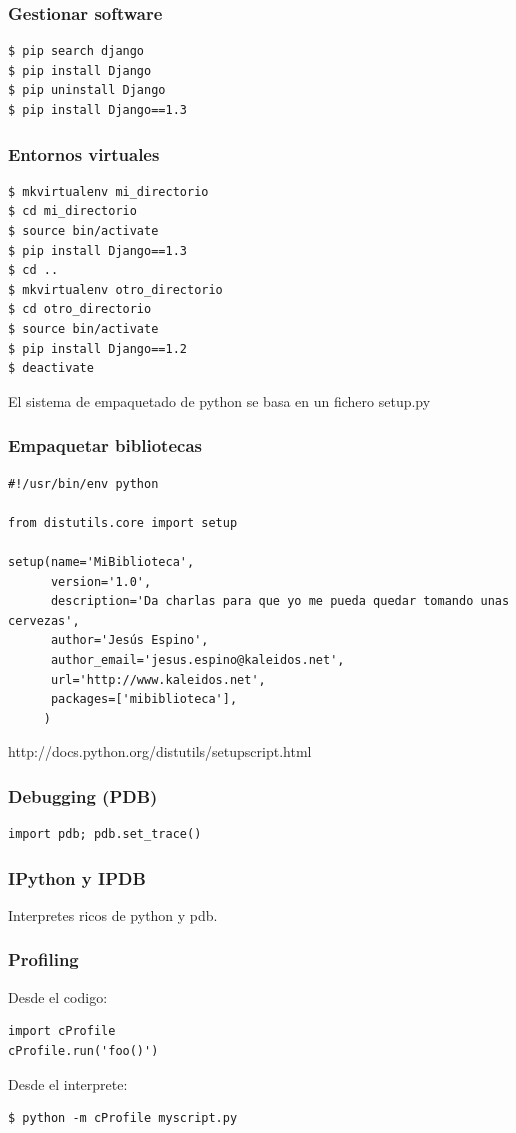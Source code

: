 \documentclass[10pt]{beamer}
\begin{document}
  \begin{frame}[containsverbatim]
    \frametitle{Gestionar software}
    \begin{verbatim}
$ pip search django
$ pip install Django
$ pip uninstall Django
$ pip install Django==1.3
    \end{verbatim}
  \end{frame}

  \begin{frame}[containsverbatim]
    \frametitle{Entornos virtuales}
    \begin{verbatim}
$ mkvirtualenv mi_directorio
$ cd mi_directorio
$ source bin/activate
$ pip install Django==1.3
$ cd ..
$ mkvirtualenv otro_directorio
$ cd otro_directorio
$ source bin/activate
$ pip install Django==1.2
$ deactivate
    \end{verbatim}
  \end{frame}

  \begin{frame}[containsverbatim]
    El sistema de empaquetado de python se basa en un fichero setup.py
    \frametitle{Empaquetar bibliotecas}
    \begin{verbatim}
#!/usr/bin/env python

from distutils.core import setup

setup(name='MiBiblioteca',
      version='1.0',
      description='Da charlas para que yo me pueda quedar tomando unas cervezas',
      author='Jesús Espino',
      author_email='jesus.espino@kaleidos.net',
      url='http://www.kaleidos.net',
      packages=['mibiblioteca'],
     )
    \end{verbatim}
http://docs.python.org/distutils/setupscript.html
  \end{frame}

  \begin{frame}[containsverbatim]
    \frametitle{Debugging (PDB)}
    \begin{verbatim}
import pdb; pdb.set_trace()
    \end{verbatim}
  \end{frame}

  \begin{frame}[containsverbatim]
    \frametitle{IPython y IPDB}
    Interpretes ricos de python y pdb.
  \end{frame}

  \begin{frame}[containsverbatim]
    \frametitle{Profiling}
    Desde el codigo:
    \begin{verbatim}
import cProfile
cProfile.run('foo()')
    \end{verbatim}
    Desde el interprete:
    \begin{verbatim}
$ python -m cProfile myscript.py
    \end{verbatim}
  \end{frame}
\end{document}
